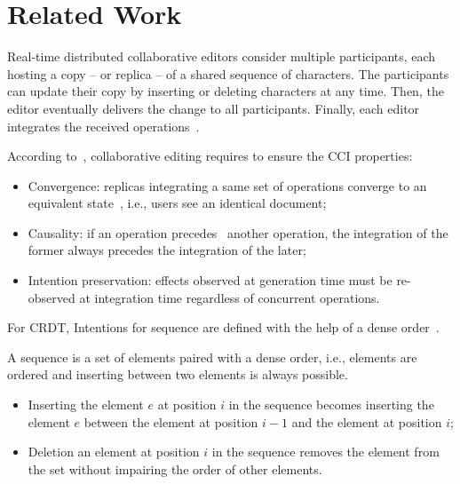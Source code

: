 \section{Related Work}
\label{sec:relatedwork}

Real-time distributed collaborative editors consider multiple participants, each
hosting a copy -- or replica -- of a shared sequence of characters. The
participants can update their copy by inserting or deleting characters at any
time. Then, the editor eventually delivers the change to all
participants. Finally, each editor integrates the received
operations~\cite{saito2005optimistic}.

\noindent According to~\cite{sun1998achieving}, collaborative editing requires
to ensure the CCI properties:
\begin{itemize}
\item Convergence: replicas integrating a same set of operations converge to an
  equivalent state~\cite{bailis2013eventual, shapiro2011conflict}, i.e., users
  see an identical document;
\item Causality: if an operation precedes~\cite{lamport1978time} another
  operation, the integration of the former always precedes the integration of
  the later;
\item Intention preservation: effects observed at generation time must be
  re-observed at integration time regardless of concurrent operations. 
\end{itemize}

For CRDT, Intentions for sequence are defined with the help of a dense
order~\cite{weiss2010logootundo}. 

\begin{definition}
  A sequence is a set of elements paired with a dense order, i.e., elements are
  ordered and inserting between two elements is always possible.
  \begin{itemize}[noitemsep]
  \item Inserting the element $e$ at position $i$ in the sequence becomes
    inserting the element $e$ between the element at position $i-1$ and the
    element at position $i$;
  \item Deletion an element at position $i$ in the sequence removes the element
    from the set without impairing the order of other elements.
  \end{itemize}
\end{definition}



